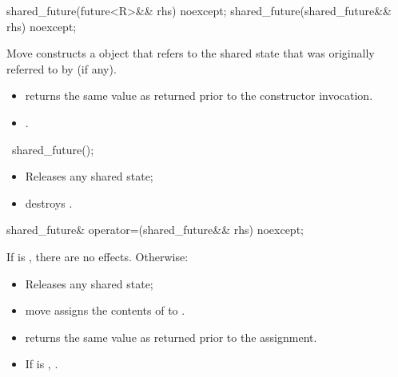 %
\begin{itemdecl}
shared_future(future<R>&& rhs) noexcept;
shared_future(shared_future&& rhs) noexcept;
\end{itemdecl}

\begin{itemdescr}
\pnum
\effects
Move constructs a  object that refers to the
shared state that was originally referred to by  (if any).

\pnum
\ensures
\begin{itemize}
\item {} returns the same value as  returned prior to
the constructor invocation.
\item {}.
\end{itemize}
\end{itemdescr}

%
\begin{itemdecl}
~shared_future();
\end{itemdecl}

\begin{itemdescr}
\pnum
\effects
\begin{itemize}
\item
Releases any shared state;
\item
destroys .
\end{itemize}
\end{itemdescr}

%
\begin{itemdecl}
shared_future& operator=(shared_future&& rhs) noexcept;
\end{itemdecl}

\begin{itemdescr}
\pnum
\effects
If  is , there are no effects.
Otherwise:
\begin{itemize}
\item
Releases any shared state;
\item
move assigns the contents of  to .
\end{itemize}

\pnum
\ensures
\begin{itemize}
\item
{} returns the same value as  returned prior to
the assignment.

\item
If  is ,
.
\end{itemize}
\end{itemdescr}

